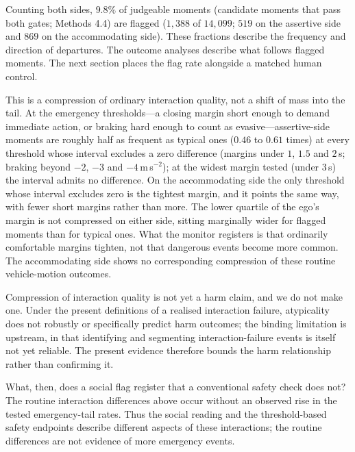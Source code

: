 \documentclass[12pt,a4paper]{article}
\begin{document}
Counting both sides, $9.8\%$ of judgeable moments (candidate moments that pass both gates; Methods 4.4)
are flagged ($1{,}388$ of $14{,}099$; $519$ on the assertive side and $869$ on the accommodating side).
These fractions describe the frequency and direction of departures. The outcome analyses describe
what follows flagged moments. The next section places the flag rate alongside a matched human control.

This is a compression of ordinary interaction quality, not a shift of mass into the tail. At the
emergency thresholds---a closing margin short enough to demand immediate action, or braking hard
enough to count as evasive---assertive-side moments are roughly half as frequent as typical ones
($0.46$ to $0.61$ times) at every threshold whose interval excludes a zero difference (margins under
$1$, $1.5$ and $2$\,s; braking beyond $-2$, $-3$ and $-4$\,m\,s$^{-2}$); at the widest margin tested
(under $3$\,s) the interval admits no difference. On the accommodating side the only threshold whose
interval excludes zero is the tightest margin, and it points the same way, with fewer short margins
rather than more. The lower quartile of the ego's margin is not compressed on either side, sitting
marginally wider for flagged moments than for typical ones. What
the monitor registers is that ordinarily comfortable margins tighten, not that dangerous events become more common.
The accommodating side shows no corresponding compression of these routine vehicle-motion outcomes.

Compression of interaction quality is not yet a harm claim, and we do not make one. Under the
present definitions of a realised interaction failure, atypicality does not robustly or specifically
predict harm outcomes; the binding limitation is upstream, in that identifying and segmenting
interaction-failure events is itself not yet reliable. The present evidence therefore bounds the
harm relationship rather than confirming it.

What, then, does a social flag register that a conventional safety check does not? The routine
interaction differences above occur without an observed rise in the tested emergency-tail rates.
Thus the social reading and the threshold-based safety endpoints describe different aspects of
these interactions; the routine differences are not evidence of more emergency events.
\end{document}
